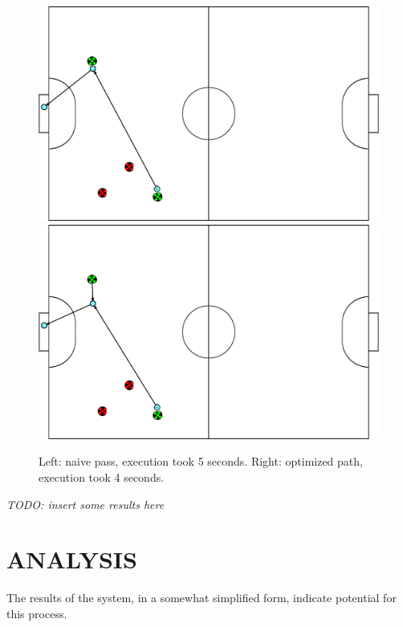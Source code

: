 \documentclass[a4paper, 10pt, conference]{ieeeconf}      %
\begin{document}
\begin{figure}[ht!]
\begin{center}
\includegraphics[totalheight=1.0in]{nonoptimized_plan.eps}
\includegraphics[totalheight=1.0in]{optimized_plan.eps}
\end{center}
\caption{Left: naive pass, execution took 5 seconds. Right: optimized path, execution took 4 seconds.}
\end{figure}

\textit{TODO: insert some results here}

\section{ANALYSIS}
The results of the system, in a somewhat simplified form, indicate potential for this process.
\end{document}

